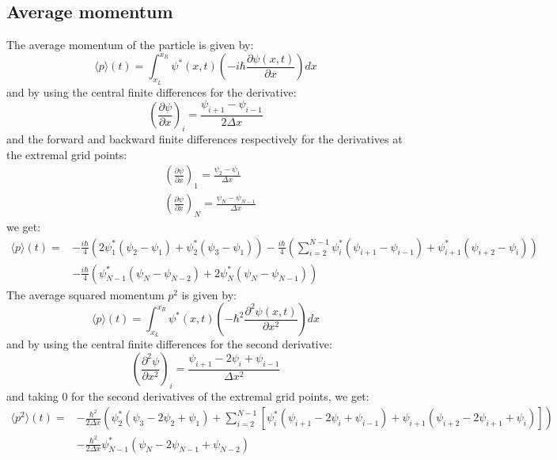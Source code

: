 \documentclass[a4paper,12pt,twoside]{article}
\begin{document}
  \subsection{Average momentum}
  The average momentum of the particle is given by:
  \begin{equation*}
   \langle p \rangle(t) = \int_{x_L}^{x_R}\psi^*(x,t)\left(-i\hbar\frac{\partial\psi(x,t)}{\partial x}\right)dx
  \end{equation*}
  and by using the central finite differences for the derivative:
  \begin{equation*}
   \left(\frac{\partial\psi}{\partial x}\right)_i = \frac{\psi_{i+1}-\psi_{i-1}}{2\Delta x}
  \end{equation*}
  and the forward and backward finite differences respectively for the derivatives at the extremal grid points:
  \begin{align*}
   &\left(\frac{\partial\psi}{\partial x}\right)_1 = \frac{\psi_{2}-\psi_{1}}{\Delta x}\\
   &\left(\frac{\partial\psi}{\partial x}\right)_N = \frac{\psi_{N}-\psi_{N-1}}{\Delta x}
  \end{align*}
  we get:
  \begin{align*}
   \langle p\rangle(t)= &-\frac{i\hbar}{4}(2\psi_1^*(\psi_2-\psi_1)+\psi_2^*(\psi_3-\psi_1)) - \frac{i\hbar}{4}\left(\sum_{i=2}^{N-1} \psi_i^*(\psi_{i+1}-\psi_{i-1})+\psi_{i+1}^*(\psi_{i+2}-\psi_i)\right)\\
   & -\frac{i\hbar}{4}(\psi_{N-1}^*(\psi_N-\psi_{N-2})+2\psi_{N}^*(\psi_N-\psi_{N-1}))
  \end{align*}
  The average squared momentum $p^2$ is given by:
  \begin{equation*}
   \langle p \rangle(t) = \int_{x_L}^{x_R}\psi^*(x,t)\left(-\hbar^2\frac{\partial^2\psi(x,t)}{\partial x^2}\right)dx
  \end{equation*}
  and by using the central finite differences for the second derivative:
  \begin{equation*}
   \left(\frac{\partial^2\psi}{\partial x^2}\right)_i = \frac{\psi_{i+1}-2\psi_{i}+\psi_{i-1}}{\Delta x^2}
  \end{equation*}
  and taking 0 for the second derivatives of the extremal grid points, we get:
  \begin{align*}
   \langle p^2\rangle(t)= &-\frac{\hbar^2}{2\Delta x}\left( \psi_2^*(\psi_3-2\psi_2+\psi_1) +\sum_{i=2}^{N-1}\left[\psi_i^*(\psi_{i+1}-2\psi_i+\psi_{i-1})+\psi_{i+1}(\psi_{i+2}-2\psi_{i+1}+\psi_i)\right]\right)\\
   &-\frac{\hbar^2}{2\Delta x} \psi_{N-1}^*(\psi_N-2\psi_{N-1}+\psi_{N-2})
  \end{align*}
\end{document}
